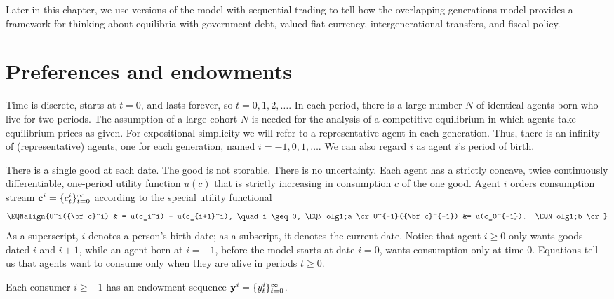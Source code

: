 

Later in this chapter,
  we use versions of the model with
sequential trading  to tell how the overlapping
generations model provides  a framework for thinking about equilibria
with government debt, valued fiat currency, intergenerational
transfers, and fiscal policy.



\section{Preferences and endowments}

Time is discrete, starts at $t=0$,
and  lasts forever, so $t=0, 1, 2, \ldots$. In each period, 
there is a large number $N$ of identical agents born who 
live for two periods. The assumption of a large cohort
$N$ is needed for the analysis of a competitive equilibrium
in which agents take equilibrium prices as given. 
For expositional simplicity
we will refer to a representative agent in each generation.
Thus, there is an infinity of (representative) agents,
one for each generation,
named $i=-1, 0, 1, \ldots$.  We can also regard $i$ as 
agent $i$'s period of birth.

  There is a single good at each date. The good is not storable.  There is no uncertainty.
  Each agent has a
strictly concave, twice  continuously
differentiable, one-period utility function $u(c)$ that
is strictly increasing in consumption  $c$ of the one good.
  Agent $i$ orders consumption stream  
${\bf c}^i = \{c_t^i\}_{t=0}^\infty$ according to the
  special  utility functional
$$\EQNalign{U^i({\bf c}^i) & = u(c_i^i) + u(c_{i+1}^i), \quad i \geq 0,
 \EQN olg1;a \cr
    U^{-1}({\bf c}^{-1}) &= u(c_0^{-1}). \EQN olg1;b \cr} $$
As a superscript, $i$ denotes a person's birth date; as a subscript, it denotes the current date.  
Notice that agent $i \geq 0 $ only wants goods dated $i$ and $i+1$, while an agent born at $i=-1$, before the
model starts at date $i =0$, wants consumption only at time $0$.
Equations  tell us  that agents
want to consume only when they are alive in periods $t\geq 0$.

Each consumer $i \geq -1$ has an endowment sequence 
${\bf y}^i = \{y_t^i\}_{t=0}^\infty$.

